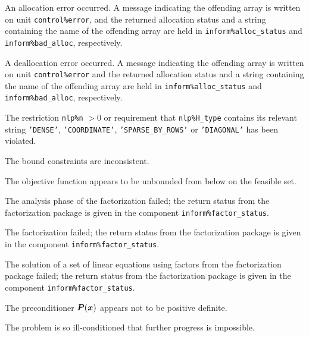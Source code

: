 \documentclass{galahad}
\begin{document}
\begin{description}

 An allocation error occurred.
A message indicating the offending
array is written on unit {\tt control\%error}, and the returned allocation
status and a string containing the name of the offending array
are held in {\tt inform\%alloc\_\-status}
and {\tt inform\%bad\_alloc}, respectively.

 A deallocation error occurred.
A message indicating the offending
array is written on unit {\tt control\%error} and the returned allocation
status and a string containing the name of the offending array
are held in {\tt inform\%alloc\_\-status}
and {\tt inform\%bad\_alloc}, respectively.

  The restriction {\tt nlp\%n} $> 0$
  or requirement that {\tt nlp\%H\_type} contains its relevant string
  {\tt 'DENSE'}, {\tt 'COORDINATE'}, {\tt 'SPARSE\_BY\_ROWS'}
  or {\tt 'DIAGONAL'}
  has been violated.


 The bound constraints are inconsistent.

  The objective function appears to be unbounded
 from below on the feasible set.

 The analysis phase of the factorization failed;
 the return status from the factorization
    package is given in the component {\tt inform\%fac\-t\-or\_status}.

 The factorization failed;
 the return status from the factorization
    package is given in the component {\tt inform\%fac\-t\-or\_status}.

 The solution of a set of linear equations
 using factors from the factorization package failed;
 the return status from the factorization
    package is given in the component {\tt inform\%fac\-t\-or\_status}.

 The preconditioner ${\bm{P}}({\bm{x}})$ appears not to
  be positive definite.

 The problem is so ill-conditioned that
  further progress is impossible.


\end{description}
\end{document}
